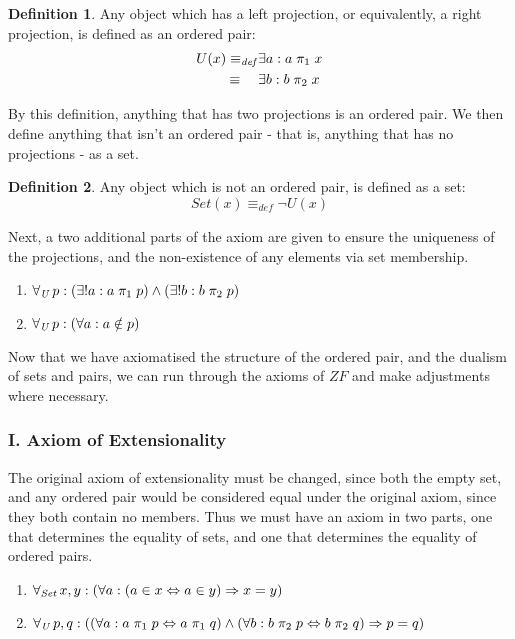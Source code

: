 \documentclass[11pt]{report}
\newcommand{\all}[1]{\forall_{\mathit{#1}}\hspace{0.5mm}}
\newcommand{\eqdef}{\equiv_\mathit{def}}
\newcommand{\pleft}{\mathrel{\pi_1}}
\newcommand{\pright}{\mathrel{\pi_2}}
\theoremstyle{definition}
\theoremstyle{theorem}
\theoremstyle{lemma}
\newtheorem{definition}{Definition}[section]
\begin{document}
\begin{definition} Any object which has a left projection, or equivalently, a right projection, is defined as an ordered pair:
\begin{align*}
  U(x) \eqdef &\exists a: a\pleft x \\
       \equiv\hspace{4.5mm}&\exists b: b\pright x
\end{align*}
\end{definition}
\noindent
By this definition, anything that has two projections is an ordered pair. We then define anything that isn't an ordered pair - that is, anything that has no projections - as a set.
\begin{definition} Any object which is not an ordered pair, is defined as a set:
$$\mathit{Set}(x) \eqdef \neg\mathit{U}(x)$$
\end{definition}
\noindent
Next, a two additional parts of the axiom are given to ensure the uniqueness of the projections, and the non-existence of any elements via set membership.
\begin{enumerate}[resume, label=(\roman*)]
  \item $\all{U} p: (\exists!a: a\pleft p) \wedge (\exists!b: b\pright p)$
  \item $\all{U} p: (\forall a: a\notin p)$
\end{enumerate}
Now that we have axiomatised the structure of the ordered pair, and the dualism of sets and pairs, we can run through the axioms of $\mathit{ZF}$ and make adjustments where necessary.

\subsubsection*{I. Axiom of Extensionality}
The original axiom of extensionality must be changed, since both the empty set, and any ordered pair would be considered equal under the original axiom, since they both contain no members.
Thus we must have an axiom in two parts, one that determines the equality of sets, and one that determines the equality of ordered pairs.
\begin{enumerate}[label=(\roman*)]
\item $\all{Set} x,y:
        (\forall a:
          (a\in x \Leftrightarrow a\in y) \Rightarrow x=y)$
\item $\all{U} p,q: ((\forall a: a\pleft p \Leftrightarrow a\pleft q)
             \wedge (\forall b: b\pright p \Leftrightarrow b\pright q)
             \Rightarrow p=q)$
\end{enumerate}
\end{document}
